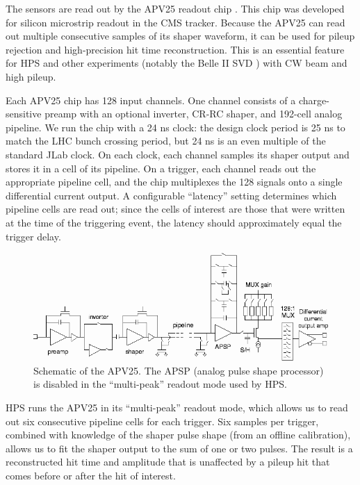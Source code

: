 The sensors are read out by the APV25 readout chip \cite{french_design_2001}.
This chip was developed for silicon microstrip readout in the CMS tracker.
Because the APV25 can read out multiple consecutive samples of its shaper waveform, it can be used for pileup rejection and high-precision hit time reconstruction.
This is an essential feature for HPS and other experiments (notably the Belle II SVD \cite{liu_belle_2012}) with CW beam and high pileup.

Each APV25 chip has 128 input channels.
One channel consists of a charge-sensitive preamp with an optional inverter, CR-RC shaper, and 192-cell analog pipeline.
We run the chip with a 24 ns clock: the design clock period is 25 ns to match the LHC bunch crossing period, but 24 ns is an even multiple of the standard JLab clock.
On each clock, each channel samples its shaper output and stores it in a cell of its pipeline.
On a trigger, each channel reads out the appropriate pipeline cell, and the chip multiplexes the 128 signals onto a single differential current output.
A configurable ``latency'' setting determines which pipeline cells are read out; since the cells of interest are those that were written at the time of the triggering event, the latency should approximately equal the trigger delay.

\begin{figure}[htp]
    \includegraphics[width=\textwidth]{detector/figs/apv25}
    \caption{Schematic of the APV25. The APSP (analog pulse shape processor) is disabled in the ``multi-peak'' readout mode used by HPS.}
    \label{fig:apv25}
\end{figure}

HPS runs the APV25 in its ``multi-peak'' readout mode, which allows us to read out six consecutive pipeline cells for each trigger.
Six samples per trigger, combined with knowledge of the shaper pulse shape (from an offline calibration), allows us to fit the shaper output to the sum of one or two pulses.
The result is a reconstructed hit time and amplitude that is unaffected by a pileup hit that comes before or after the hit of interest.

